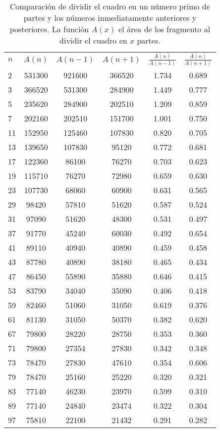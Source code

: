 \begin{table}[!h]
\begin{tabular}{l|c|c|c|c|c}
	$n$ & $A(n)$ & $A(n-1)$ & $A(n+1)$ &
	$\frac{A(n)}{A(n-1)}$ &
	$\frac{A(n)}{A(n+1)}$ \\
	2 & 531300 & 921600 & 366520 & 1.734 & 0.689 \\
	3 & 366520 & 531300 & 284900 & 1.449 & 0.777 \\
	5 & 235620 & 284900 & 202510 & 1.209 & 0.859 \\
	7 & 202160 & 202510 & 151700 & 1.001 & 0.750 \\
	11 & 152950 & 125460 & 107830 & 0.820 & 0.705 \\
	13 & 139650 & 107830 & 95120 & 0.772 & 0.681 \\
	17 & 122360 & 86100 & 76270 & 0.703 & 0.623 \\
	19 & 115710 & 76270 & 72980 & 0.659 & 0.630 \\
	23 & 107730 & 68060 & 60900 & 0.631 & 0.565 \\
	29 & 98420 & 57810 & 51620 & 0.587 & 0.524 \\
	31 & 97090 & 51620 & 48300 & 0.531 & 0.497 \\
	37 & 91770 & 45240 & 60030 & 0.492 & 0.654 \\
	41 & 89110 & 40940 & 40890 & 0.459 & 0.458 \\
	43 & 87780 & 40890 & 38180 & 0.465 & 0.434 \\
	47 & 86450 & 55890 & 35880 & 0.646 & 0.415 \\
	53 & 83790 & 34040 & 35090 & 0.406 & 0.418 \\
	59 & 82460 & 51060 & 31050 & 0.619 & 0.376 \\
	61 & 81130 & 31050 & 50370 & 0.382 & 0.620 \\
	67 & 79800 & 28220 & 28750 & 0.353 & 0.360 \\
	71 & 79800 & 27354 & 27830 & 0.342 & 0.348 \\
	73 & 78470 & 27830 & 47610 & 0.354 & 0.606 \\
	79 & 78470 & 25160 & 25220 & 0.320 & 0.321 \\
	83 & 77140 & 46230 & 23970 & 0.599 & 0.310 \\
	89 & 77140 & 24840 & 23474 & 0.322 & 0.304 \\
	97 & 75810 & 22100 & 21432 & 0.291 & 0.282 \\
\end{tabular}

\caption{Comparación de dividir el cuadro en un número primo de partes y los
números inmediatamente anteriores y posteriores. La función $A(x)$ el área de
los fragmento al dividir el cuadro en $x$ partes.}
\label{tabArea}
\end{table}

